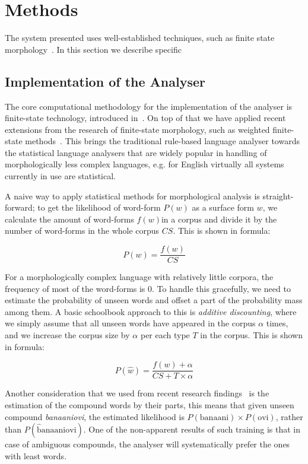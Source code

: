 \documentclass[a4paper,12pt]{article}
\begin{document}
\section{Methods}

The system presented uses well-established techniques, such as
finite state morphology~\cite{beesley2003finite}. In this section we
describe specific

\subsection{Implementation of the Analyser}

The core computational methodology for the implementation of the analyser is
finite-state technology, introduced
in~\cite{koskenniemi1983twolevel,beesley2003finite}. On top of that we
have applied recent extensions from the research of finite-state morphology,
such as weighted finite-state methods~\cite{openfst,hfst2012}. This brings the
traditional rule-based language analyser towards the statistical language
analysers that are widely popular in handling of morphologically less
complex languages, e.g. for English virtually all systems currently in use
are statistical.

A naive way to apply statistical methods for morphological analysis is
straight-forward; to get the likelihood of word-form $P(w)$ as a surface form
$w$, we calculate the amount of word-forms $f(w)$in a corpus and divide it by
the number of word-forms in the whole corpus $CS$. This is shown in formula:

$$
P(w) = \frac{f(w)}{CS}
$$

For a morphologically complex language with relatively little corpora, the
frequency of most of the word-forms is $0$. To handle this gracefully, we need
to estimate the probability of unseen words and offset a part of the
probability mass among them. A basic schoolbook approach to this is
\emph{additive discounting}, where we simply assume that all unseen words have
appeared in the corpus $\alpha$ times, and we increase the corpus size by
$\alpha$ per each type $T$ in the corpus. This is shown in formula:

$$
P(\hat w) = \frac{f(w) + \alpha}{CS + T \times \alpha}
$$

Another consideration that we used from recent research
findings~\cite{pirinen2009weighting} is the estimation of the compound words by
their parts, this means that given unseen compound \emph{banaaniovi}, the
estimated likelihood is $P(\mathrm{banaani}) \times P(\mathrm{ovi})$, rather
than $P(\mathrm{\hat banaaniovi})$. One of the non-apparent results of such
training is that in case of ambiguous compounds, the analyser will
systematically prefer the ones with least words.
\end{document}
